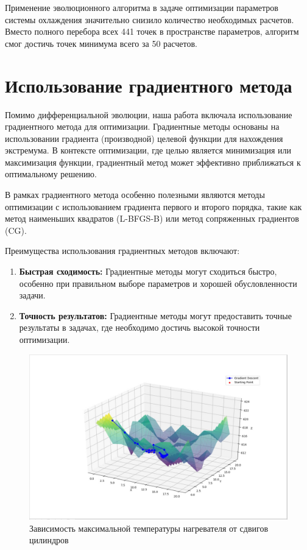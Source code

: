 \documentclass[a4paper,12pt]{article}
\theoremstyle{plain} %
\theoremstyle{definition} %
\theoremstyle{remark} %
\begin{document}
Применение эволюционного алгоритма в задаче оптимизации параметров системы охлаждения значительно снизило количество необходимых расчетов. Вместо полного перебора всех 441 точек в пространстве параметров, алгоритм смог достичь точек минимума всего за 50 расчетов.

\section{Использование градиентного метода}

Помимо дифференциальной эволюции, наша работа включала использование градиентного метода для оптимизации. Градиентные методы основаны на использовании градиента (производной) целевой функции для нахождения экстремума. В контексте оптимизации, где целью является минимизация или максимизация функции, градиентный метод может эффективно приближаться к оптимальному решению.

В рамках градиентного метода особенно полезными являются методы оптимизации с использованием градиента первого и второго порядка, такие как метод наименьших квадратов (L-BFGS-B) или метод сопряженных градиентов (CG).

Преимущества использования градиентных методов включают:

\begin{enumerate}
    \item \textbf{Быстрая сходимость:} Градиентные методы могут сходиться быстро, особенно при правильном выборе параметров и хорошей обусловленности задачи.

    \item \textbf{Точность результатов:} Градиентные методы могут предоставить точные результаты в задачах, где необходимо достичь высокой точности оптимизации.
\end{enumerate}

\begin{figure}[h]
	\begin{center}
		\includegraphics[width=0.4\linewidth]{24.jpg}
		\caption{Зависимость максимальной температуры нагревателя от сдвигов цилиндров} %
	\end{center}
\end{figure}
\end{document}
